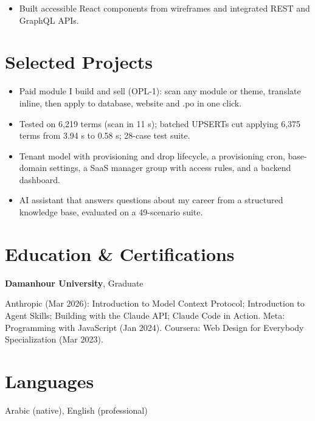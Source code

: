 \documentclass[10pt,a4paper]{article}
\begin{document}
\begin{itemize}
  \item Built accessible React components from wireframes and integrated REST and GraphQL APIs.
\end{itemize}

\section*{Selected Projects}
\begin{itemize}
  \item Paid module I build and sell (OPL-1): scan any module or theme, translate inline, then apply to database, website and .po in one click.
  \item Tested on 6,219 terms (scan in 11 s); batched UPSERTs cut applying 6,375 terms from 3.94 s to 0.58 s; 28-case test suite.
\end{itemize}

\begin{itemize}
  \item Tenant model with provisioning and drop lifecycle, a provisioning cron, base-domain settings, a SaaS manager group with
        access rules, and a backend dashboard.
\end{itemize}

\begin{itemize}
  \item AI assistant that answers questions about my career from a structured knowledge base, evaluated on a 49-scenario suite.
\end{itemize}

\section*{Education \& Certifications}
\textbf{Damanhour University}, Graduate\par\vspace{2pt}
Anthropic (Mar 2026): Introduction to Model Context Protocol; Introduction to Agent Skills; Building with the Claude API; Claude Code in Action.
Meta: Programming with JavaScript (Jan 2024). Coursera: Web Design for Everybody Specialization (Mar 2023).

\section*{Languages}
Arabic (native), English (professional)
\end{document}
